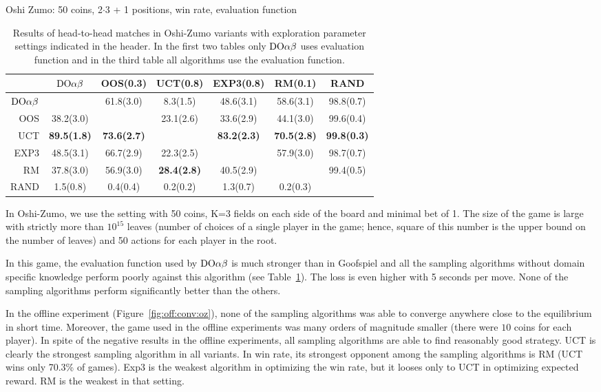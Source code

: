 \begin{table}[t!]
\begin{scriptsize}
Oshi Zumo: 50 coins, 2$\cdot$3 + 1 positions, win rate, evaluation function
\begin{tabular}{|r|cccccc|}\hline
&$\textrm{DO}\alpha\beta$&OOS(0.3)&UCT(0.8)&EXP3(0.8)&RM(0.1)&RAND\\\hline
$\textrm{DO}\alpha\beta$&&61.8(3.0)&8.3(1.5)&48.6(3.1)&58.6(3.1)&98.8(0.7)\\
OOS&38.2(3.0)&&23.1(2.6)&33.6(2.9)&44.1(3.0)&99.6(0.4)\\
UCT&\textbf{89.5(1.8)}&\textbf{73.6(2.7)}&&\textbf{83.2(2.3)}&\textbf{70.5(2.8)}&\textbf{99.8(0.3)}\\
EXP3&48.5(3.1)&66.7(2.9)&22.3(2.5)&&57.9(3.0)&98.7(0.7)\\
RM&37.8(3.0)&56.9(3.0)&\textbf{28.4(2.8)}&40.5(2.9)&&99.4(0.5)\\
RAND&1.5(0.8)&0.4(0.4)&0.2(0.2)&1.3(0.7)&0.2(0.3)&\\
\hline
\end{tabular}
\end{scriptsize}
\caption{Results of head-to-head matches in Oshi-Zumo variants with exploration parameter settings indicated in the header. In the first two tables only $\textrm{DO}\alpha\beta$ uses evaluation function and in the third table all algorithms use the evaluation function.}\label{fig:matches:oz}
\end{table}

In Oshi-Zumo, we use the setting with 50 coins, K=3 fields on each side of the board and minimal bet of 1.
The size of the game is large with strictly more than $10^{15}$ leaves (number of choices of a single player in the game; hence, square of this number is the upper bound on the number of leaves) and 50 actions for each player in the root.

In this game, the evaluation function used by $\textrm{DO}\alpha\beta$ is much stronger than in Goofspiel and all the sampling algorithms without domain specific knowledge perform poorly against this algorithm (see Table~\ref{fig:matches:oz}). The loss is even higher with 5 seconds per move. None of the sampling algorithms perform significantly better than the others.

In the offline experiment (Figure~\ref{fig:off:conv:oz}), none of the sampling algorithms was able to converge anywhere close to the equilibrium in short time. Moreover, the game used in the offline experiments was many orders of magnitude smaller (there were $10$ coins for each player).
In spite of the negative results in the offline experiments, all sampling algorithms are able to find reasonably good strategy.
UCT is clearly the strongest sampling algorithm in all variants.
In win rate, its strongest opponent among the sampling algorithms is RM (UCT wins only 70.3\% of games). Exp3 is the weakest algorithm in optimizing the win rate, but it looses only to UCT in optimizing expected reward. RM is the weakest in that setting.

